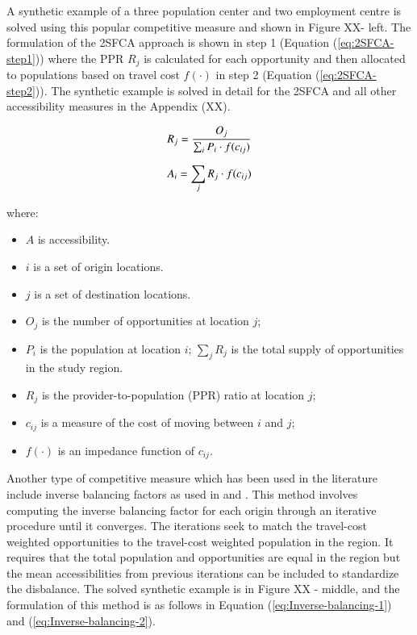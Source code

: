 \documentclass[]{elsarticle} %
\providecommand{\tightlist}{%
  \setlength{\itemsep}{0pt}\setlength{\parskip}{0pt}}
\begin{document}
A synthetic example of a three population center and two employment
centre is solved using this popular competitive measure and shown in
Figure XX- left. The formulation of the 2SFCA approach is shown in step
1 (Equation (\ref{eq:2SFCA-step1})) where the PPR \(R_j\) is calculated
for each opportunity and then allocated to populations based on travel
cost \(f(\cdot)\) in step 2 (Equation (\ref{eq:2SFCA-step2})). The
synthetic example is solved in detail for the 2SFCA and all other
accessibility measures in the Appendix (XX).

\begin{equation}
\label{eq:2SFCA-step1}
R_{j} = \frac{O_{j}}{\sum_i P_{i} \cdot f(c_{ij})}\\
\end{equation}

\begin{equation}
\label{eq:2SFCA-step2}
A_{i} = {\sum_j R_{j} \cdot f(c_{ij})}\\
\end{equation}

\noindent where:

\begin{itemize}
\tightlist
\item
  \(A\) is accessibility.
\item
  \(i\) is a set of origin locations.
\item
  \(j\) is a set of destination locations.
\item
  \(O_j\) is the number of opportunities at location \(j\);
\item
  \(P_i\) is the population at location \(i\); \(\sum_j R_j\) is the
  total supply of opportunities in the study region.
\item
  \(R_j\) is the provider-to-population (PPR) ratio at location \(j\);
\item
  \(c_{ij}\) is a measure of the cost of moving between \(i\) and \(j\);
\item
  \(f(\cdot)\) is an impedance function of \(c_{ij}\).
\end{itemize}

Another type of competitive measure which has been used in the
literature include inverse balancing factors as used in
\citep{horner_exploring_2004} and \citep{allen2019}. This method
involves computing the inverse balancing factor for each origin through
an iterative procedure until it converges. The iterations seek to match
the travel-cost weighted opportunities to the travel-cost weighted
population in the region. It requires that the total population and
opportunities are equal in the region but the mean accessibilities from
previous iterations can be included to standardize the disbalance. The
solved synthetic example is in Figure XX - middle, and the formulation
of this method is as follows in Equation (\ref{eq:Inverse-balancing-1})
and (\ref{eq:Inverse-balancing-2}).
\end{document}
